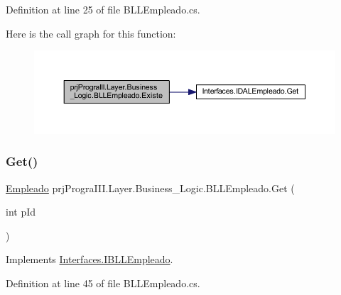 Definition at line 25 of file B\+L\+L\+Empleado.\+cs.

Here is the call graph for this function\+:
\nopagebreak
\begin{figure}[H]
\begin{center}
\leavevmode
\includegraphics[width=350pt]{classprj_progra_i_i_i_1_1_layer_1_1_business___logic_1_1_b_l_l_empleado_a48d3674dd0f14fd4e3a95f6fdcea4467_cgraph}
\end{center}
\end{figure}
\hypertarget{classprj_progra_i_i_i_1_1_layer_1_1_business___logic_1_1_b_l_l_empleado_abf66d9719a5e3c0f1914f0ae0d4ef671}{}\label{classprj_progra_i_i_i_1_1_layer_1_1_business___logic_1_1_b_l_l_empleado_abf66d9719a5e3c0f1914f0ae0d4ef671} 
\subsubsection{\texorpdfstring{Get()}{Get()}}
{\footnotesize\ttfamily \hyperlink{classprj_progra_i_i_i_1_1_layer_1_1_entities_1_1_empleado}{Empleado} prj\+Progra\+I\+I\+I.\+Layer.\+Business\+\_\+\+Logic.\+B\+L\+L\+Empleado.\+Get (\begin{DoxyParamCaption}\item[{int}]{p\+Id }\end{DoxyParamCaption})}



Implements \hyperlink{interface_interfaces_1_1_i_b_l_l_empleado_a9eea24cebb452257b579be1c998f4a98}{Interfaces.\+I\+B\+L\+L\+Empleado}.



Definition at line 45 of file B\+L\+L\+Empleado.\+cs.

